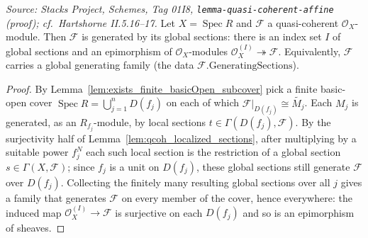 \begin{lemma}
  \label{lem:qcoh_global_generation}
  \textit{Source: Stacks Project, Schemes, Tag 01I8, \texttt{lemma-quasi-coherent-affine}
  (proof); cf.\ Hartshorne II.5.16--17.}
  Let \(X = \operatorname{Spec} R\) and \(\mathcal{F}\) a quasi-coherent
  \(\mathcal{O}_X\)-module. Then \(\mathcal{F}\) is generated by its global sections:
  there is an index set \(I\) of global sections and an epimorphism of
  \(\mathcal{O}_X\)-modules \(\mathcal{O}_X^{(I)} \twoheadrightarrow \mathcal{F}\).
  Equivalently, \(\mathcal{F}\) carries a global generating family (the data
  \(\mathcal{F}.\mathrm{GeneratingSections}\)).
\end{lemma}
\begin{proof}
  By Lemma~\ref{lem:exists_finite_basicOpen_subcover} pick a finite basic-open cover
  \(\operatorname{Spec} R = \bigcup_{j=1}^{n} D(f_j)\) on each of which
  \(\mathcal{F}|_{D(f_j)} \cong \widetilde{M_j}\). Each \(M_j\) is generated, as an
  \(R_{f_j}\)-module, by local sections \(t \in \Gamma(D(f_j), \mathcal{F})\). By the
  surjectivity half of Lemma~\ref{lem:qcoh_localized_sections}, after multiplying by a
  suitable power \(f_j^{N}\) each such local section is the restriction of a global
  section \(s \in \Gamma(X, \mathcal{F})\); since \(f_j\) is a unit on \(D(f_j)\), these
  global sections still generate \(\mathcal{F}\) over \(D(f_j)\). Collecting the finitely
  many resulting global sections over all \(j\) gives a family that generates
  \(\mathcal{F}\) on every member of the cover, hence everywhere: the induced map
  \(\mathcal{O}_X^{(I)} \to \mathcal{F}\) is surjective on each \(D(f_j)\) and so is an
  epimorphism of sheaves.
\end{proof}

